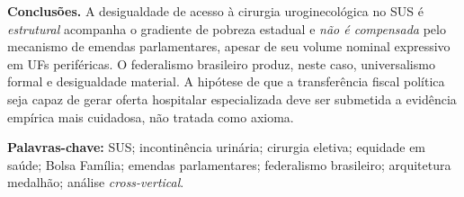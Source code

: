 \documentclass[12pt,a4paper,oneside]{article}
\begin{document}
\begin{singlespace}
\textbf{Conclusões.} A desigualdade de acesso à cirurgia
uroginecológica no SUS é \textit{estrutural} \textendash{}
acompanha o gradiente de pobreza estadual \textendash{} e
\textit{não é compensada} pelo mecanismo de emendas
parlamentares, apesar de seu volume nominal expressivo em UFs
periféricas. O federalismo brasileiro produz, neste caso,
universalismo formal e desigualdade material. A hipótese de
que a transferência fiscal política seja capaz de gerar oferta
hospitalar especializada deve ser submetida a evidência empírica
mais cuidadosa, não tratada como axioma.

\vspace{4pt}
\textbf{Palavras-chave:} SUS; incontinência urinária; cirurgia
eletiva; equidade em saúde; Bolsa Família; emendas parlamentares;
federalismo brasileiro; arquitetura medalhão; análise
\textit{cross-vertical}.
\end{singlespace}

\end{document}
